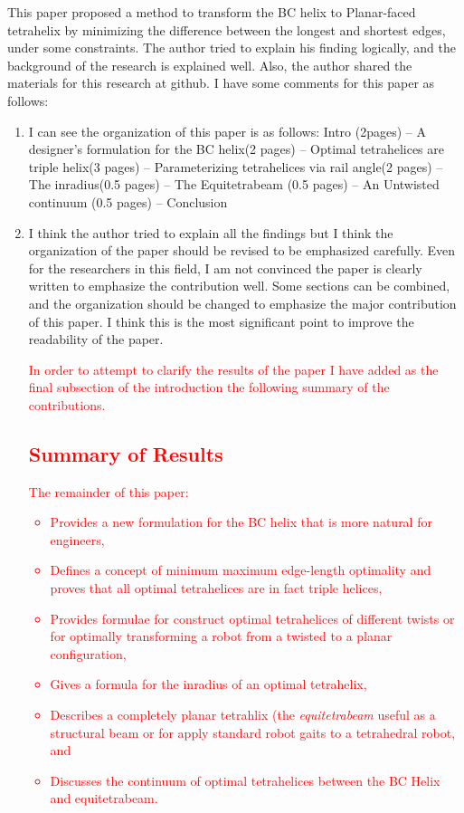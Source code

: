 \documentclass{article}
\newcommand{\highlighttext}[1] {\textcolor{red}{#1}}
\begin{document}
This paper proposed a method to transform the BC helix to Planar-faced tetrahelix by minimizing the difference between the longest and shortest edges, under some constraints. The author tried to explain his finding logically, and the background of the research is explained well. Also, the author shared the materials for this research at github. I have some comments for this paper as follows:

\begin{enumerate}

  \item
 I can see the organization of this paper is as follows: 
 Intro (2pages) – A designer’s formulation for the BC helix(2 pages) – Optimal tetrahelices are triple helix(3 pages) – Parameterizing tetrahelices via rail angle(2 pages) – The inradius(0.5 pages) – The Equitetrabeam (0.5 pages) – An Untwisted continuum (0.5 pages) – Conclusion
 \item 
   I think the author tried to explain all the findings but I think the organization of the paper should be revised to be emphasized carefully. Even for the researchers in this field, I am not convinced the paper is clearly written to emphasize the contribution well. Some sections can be combined, and the organization should be changed to emphasize the major contribution of this paper. I think this is the most significant point to improve the readability of the paper.

   \highlighttext {
     In order to attempt to clarify the results of the paper I have added as the final subsection of the introduction the following summary of the contributions.
\subsection{Summary of Results}
The remainder of this  paper:
\begin{itemize}
\item Provides a new formulation for the BC helix that is more natural for engineers,
\item Defines a concept of minimum maximum edge-length optimality and proves that all
    optimal tetrahelices are in fact triple helices,
\item Provides formulae for construct optimal tetrahelices of different twists or for optimally
    transforming a
    robot from a twisted to a planar configuration,
\item Gives a formula for the inradius of an optimal tetrahelix,
\item Describes a completely planar tetrahlix (the \emph{equitetrabeam} useful as a structural beam or for apply standard robot gaits to a tetrahedral robot, and
\item Discusses the continuum of optimal tetrahelices between the BC Helix and equitetrabeam.
\end{itemize}
}


\end{enumerate}
\end{document}
